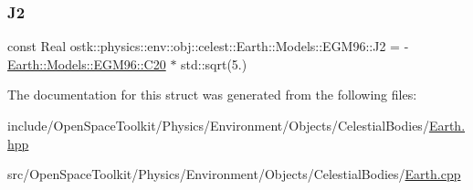 \subsubsection{\texorpdfstring{J2}{J2}}
{\footnotesize\ttfamily const Real ostk\+::physics\+::env\+::obj\+::celest\+::\+Earth\+::\+Models\+::\+E\+G\+M96\+::\+J2 = -\/\hyperlink{structostk_1_1physics_1_1env_1_1obj_1_1celest_1_1_earth_1_1_models_1_1_e_g_m96_a9ae4801d69fc8be4dcb24bc7496ff5b7}{Earth\+::\+Models\+::\+E\+G\+M96\+::\+C20} $\ast$ std\+::sqrt(5.)\hspace{0.3cm}{\ttfamily [static]}}



The documentation for this struct was generated from the following files\+:\begin{DoxyCompactItemize}
\item 
include/\+Open\+Space\+Toolkit/\+Physics/\+Environment/\+Objects/\+Celestial\+Bodies/\hyperlink{_objects_2_celestial_bodies_2_earth_8hpp}{Earth.\+hpp}\item 
src/\+Open\+Space\+Toolkit/\+Physics/\+Environment/\+Objects/\+Celestial\+Bodies/\hyperlink{_objects_2_celestial_bodies_2_earth_8cpp}{Earth.\+cpp}\end{DoxyCompactItemize}
